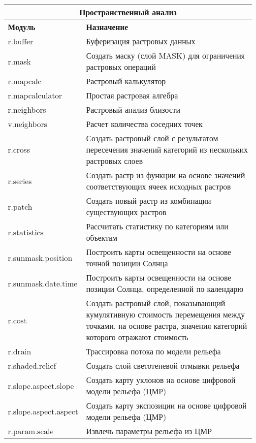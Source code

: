 {\renewcommand{\arraystretch}{0.7}
\begin{table}[H]
\centering
 \begin{tabular}{|p{4cm}|p{11cm}|}
  \hline \multicolumn{2}{|c|}{\textbf{Пространственный анализ}} \\
  \hline \textbf{Модуль} & \textbf{Назначение} \\
  \hline r.buffer & Буферизация растровых данных \\
  \hline r.mask & Создать маску (слой MASK) для ограничения растровых
  операций \\
  \hline r.mapcalc & Растровый калькулятор \\
  \hline r.mapcalculator & Простая растровая алгебра \\
  \hline r.neighbors & Растровый анализ близости \\
  \hline v.neighbors & Расчет количества соседних точек \\
  \hline r.cross & Создать растровый слой с результатом пересечения
  значений категорий из нескольких растровых слоев \\
  \hline r.series & Создать растр из функции на основе значений
  соответствующих ячеек исходных растров \\
  \hline r.patch & Создать новый растр из комбинации существующих растров \\
  \hline r.statistics & Рассчитать статистику по категориям или объектам \\
  \hline r.sunmask.position & Построить карты освещенности на основе
  точной позиции Солнца \\
  \hline r.sunmask.date.time & Построить карты освещенности на основе
  позиции Солнца, определенной по календарю \\
  \hline r.cost & Создать растровый слой, показывающий кумулятивную
  стоимость перемещения между точками, на основе растра, значения
  категорий которого отражают стоимость \\
  \hline r.drain & Трассировка потока по модели рельефа \\
  \hline r.shaded.relief & Создать слой светотеневой отмывки рельефа \\
  \hline r.slope.aspect.slope & Создать карту уклонов на основе
  цифровой модели рельефа (ЦМР) \\
  \hline r.slope.aspect.aspect & Создать карту экспозиции на основе
  цифровой модели рельефа (ЦМР) \\
  \hline r.param.scale & Извлечь параметры рельефа из ЦМР \\

\end{tabular}
\end{table}}
